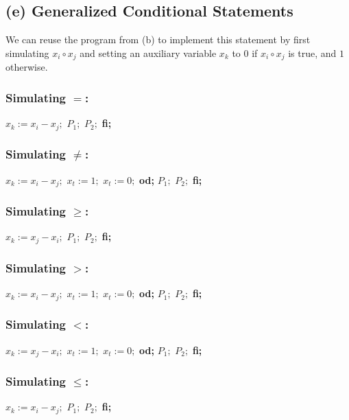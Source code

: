 \subsection*{(e) Generalized Conditional Statements}

We can reuse the program from (b) to implement this statement by first simulating \( x_i \circ x_j \) and setting an auxiliary variable \( x_k \) to \( 0 \) if \( x_i \circ x_j \) is true, and \( 1 \) otherwise.
\subsubsection*{Simulating \( = \):}
\begin{algorithmic}[1]
\State \( x_k := x_i - x_j; \)
    \State  \( P_1; \)
\Else
    \State  \( P_2; \)
\EndIf \textbf{fi;}
\end{algorithmic}

\subsubsection*{Simulating \(  \neq \):}
\begin{algorithmic}[1]
\State \( x_k := x_i - x_j; \)
\State \( x_t := 1; \)
    \State \( x_t := 0; \)
\EndFor \textbf{od;}
    \State  \( P_1; \)
\Else
    \State  \( P_2; \)
\EndIf \textbf{fi;}
\end{algorithmic}

\subsubsection*{Simulating \(  \geq \):}
\begin{algorithmic}[1]
\State \( x_k := x_j - x_i; \)
    \State  \( P_1; \)
\Else
    \State  \( P_2; \)
\EndIf \textbf{fi;}
\end{algorithmic}

\subsubsection*{Simulating \(  > \):}
\begin{algorithmic}[1]
\State \( x_k := x_i - x_j; \)
\State \( x_t := 1; \)
    \State \( x_t := 0; \)
\EndFor \textbf{od;}
    \State  \( P_1; \)
\Else
    \State  \( P_2; \)
\EndIf \textbf{fi;}
\end{algorithmic}

\subsubsection*{Simulating \(  < \):}
\begin{algorithmic}[1]
\State \( x_k := x_j - x_i; \)
\State \( x_t := 1; \)
    \State \( x_t := 0; \)
\EndFor \textbf{od;}
    \State  \( P_1; \)
\Else
    \State  \( P_2; \)
\EndIf \textbf{fi;}
\end{algorithmic}

\subsubsection*{Simulating \( \leq \):}
\begin{algorithmic}[1]
\State \( x_k := x_i - x_j; \)
    \State  \( P_1; \)
\Else
    \State  \( P_2; \)
\EndIf \textbf{fi;}
\end{algorithmic}



